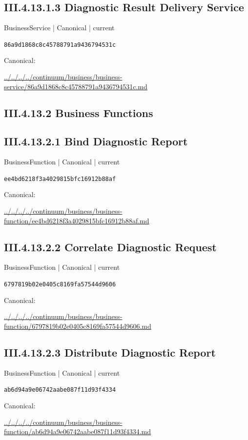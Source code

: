 \documentclass[10pt,a4paper]{article}
\begin{document}
\subsection*{III.4.13.1.3 Diagnostic Result Delivery Service}
{\small BusinessService | Canonical | current}\par
\texttt{86a9d1868c8c45788791a9436794531c}\par
Canonical: \par
{\footnotesize\url{../../../../continuum/business/business-service/86a9d1868c8c45788791a9436794531c.md}}\par
\subsection*{III.4.13.2 Business Functions}
\subsection*{III.4.13.2.1 Bind Diagnostic Report}
{\small BusinessFunction | Canonical | current}\par
\texttt{ee4bd6218f3a4029815bfc16912b88af}\par
Canonical: \par
{\footnotesize\url{../../../../continuum/business/business-function/ee4bd6218f3a4029815bfc16912b88af.md}}\par
\subsection*{III.4.13.2.2 Correlate Diagnostic Request}
{\small BusinessFunction | Canonical | current}\par
\texttt{6797819b02e0405c8169fa57544d9606}\par
Canonical: \par
{\footnotesize\url{../../../../continuum/business/business-function/6797819b02e0405c8169fa57544d9606.md}}\par
\subsection*{III.4.13.2.3 Distribute Diagnostic Report}
{\small BusinessFunction | Canonical | current}\par
\texttt{ab6d94a9e06742aabe087f11d93f4334}\par
Canonical: \par
{\footnotesize\url{../../../../continuum/business/business-function/ab6d94a9e06742aabe087f11d93f4334.md}}\par
\end{document}
